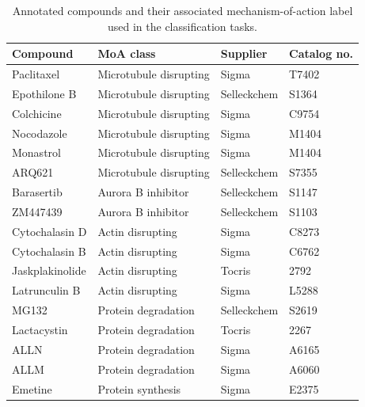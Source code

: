 \documentclass[a4paper,11pt,twoside,openright]{scrbook}
\begin{document}
\begin{table}[]
    \begin{footnotesize}
    \centering
    \captionsetup{width=0.635\textwidth}
    \caption[Annotated compounds of known MoA]{Annotated compounds and their associated mechanism-of-action label used in the classification tasks.}
    \label{table:compounds}
    \begin{tabular}{@{}llll@{}}
    \toprule
    Compound        & MoA class              & Supplier    & Catalog no. \\ \midrule
    Paclitaxel      & Microtubule disrupting & Sigma       & T7402       \\
    Epothilone B    & Microtubule disrupting & Selleckchem & S1364       \\
    Colchicine      & Microtubule disrupting & Sigma       & C9754       \\
    Nocodazole      & Microtubule disrupting & Sigma       & M1404       \\
    Monastrol       & Microtubule disrupting & Sigma       & M1404       \\
    ARQ621          & Microtubule disrupting & Selleckchem & S7355       \\
    Barasertib      & Aurora B inhibitor     & Selleckchem & S1147       \\
    ZM447439        & Aurora B inhibitor     & Selleckchem & S1103       \\
    Cytochalasin D  & Actin disrupting       & Sigma       & C8273       \\
    Cytochalasin B  & Actin disrupting       & Sigma       & C6762       \\
    Jaskplakinolide & Actin disrupting       & Tocris      & 2792        \\
    Latrunculin B   & Actin disrupting       & Sigma       & L5288       \\
    MG132           & Protein degradation    & Selleckchem & S2619       \\
    Lactacystin     & Protein degradation    & Tocris      & 2267        \\
    ALLN            & Protein degradation    & Sigma       & A6165       \\
    ALLM            & Protein degradation    & Sigma       & A6060       \\
    Emetine         & Protein synthesis      & Sigma       & E2375       \\

\end{tabular}
\end{footnotesize}
\end{table}
\end{document}
